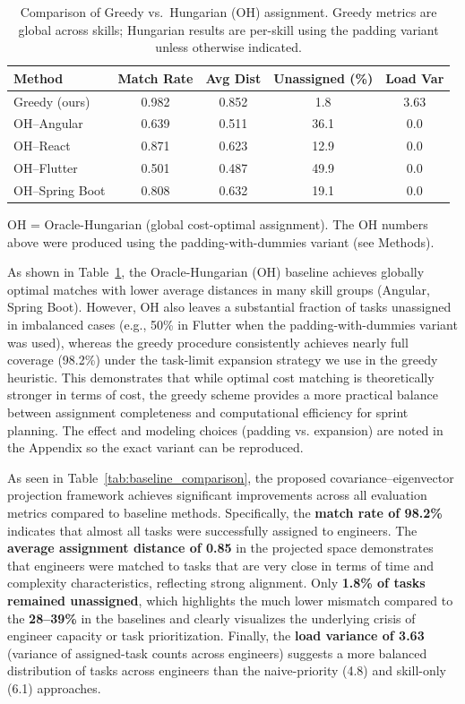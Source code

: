 \documentclass[journal]{IEEEtran}
\begin{document}
\begin{table}[H]
\centering
\caption{Comparison of Greedy vs.\ Hungarian (OH) assignment. Greedy metrics are global across skills; Hungarian results are per-skill using the padding variant unless otherwise indicated.}
\label{tab:greedy_vs_hungarian}
\begin{tabular}{lcccc}
\toprule
Method & Match Rate & Avg Dist & Unassigned (\%) & Load Var \\
\midrule
Greedy (ours) & 0.982 & 0.852 & 1.8 & 3.63 \\
OH--Angular   & 0.639 & 0.511 & 36.1 & 0.0 \\
OH--React     & 0.871 & 0.623 & 12.9 & 0.0 \\
OH--Flutter   & 0.501 & 0.487 & 49.9 & 0.0 \\
OH--Spring Boot & 0.808 & 0.632 & 19.1 & 0.0 \\
\bottomrule
\end{tabular}
\end{table}

\noindent\footnotesize{OH = Oracle-Hungarian (global cost-optimal assignment). The OH numbers above were produced using the padding-with-dummies variant (see Methods).}
\normalsize
\vspace{6pt}

As shown in Table~\ref{tab:greedy_vs_hungarian}, the Oracle-Hungarian (OH) baseline \cite{kuhn1955hungarian,munkres1957algorithms,BurkardAssignmentBook}
achieves globally optimal matches with lower average distances in many skill groups (Angular, Spring Boot). However, OH also leaves a substantial fraction of tasks unassigned in imbalanced cases (e.g., 50\% in Flutter when the padding-with-dummies variant was used), whereas the greedy procedure consistently achieves nearly full coverage (98.2\%) under the task-limit expansion strategy we use in the greedy heuristic. This demonstrates that while optimal cost matching is theoretically stronger in terms of cost, the greedy scheme provides a more practical balance between assignment completeness and computational efficiency for sprint planning. The effect and modeling choices (padding vs. expansion) are noted in the Appendix so the exact variant can be reproduced.

\vspace{6pt}
As seen in Table~\ref{tab:baseline_comparison}, the proposed covariance--eigenvector projection framework
achieves significant improvements across all evaluation metrics compared to baseline methods.
Specifically, the \textbf{match rate of 98.2\%} indicates that almost all tasks were successfully assigned to engineers.
The \textbf{average assignment distance of 0.85} in the projected space demonstrates that engineers were matched
to tasks that are very close in terms of time and complexity characteristics, reflecting strong alignment.
Only \textbf{1.8\% of tasks remained unassigned}, which highlights the much lower mismatch compared to the \textbf{28--39\%} in the baselines and clearly visualizes the underlying crisis of engineer capacity or task prioritization.
Finally, the \textbf{load variance of 3.63} (variance of assigned-task counts across engineers) suggests a more balanced distribution of tasks across engineers
than the naive-priority (4.8) and skill-only (6.1) approaches.
\end{document}
